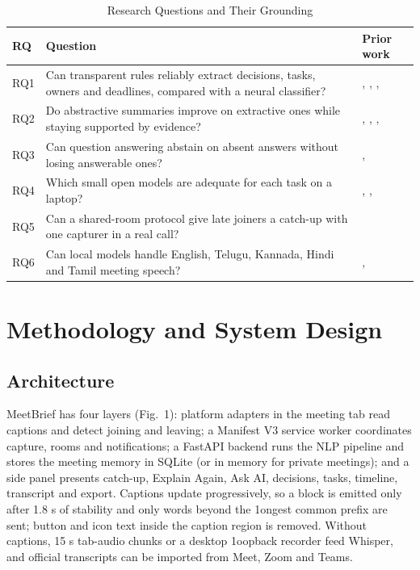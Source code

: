\documentclass[conference]{IEEEtran}
\begin{document}
\begin{table}[htbp]
\caption{Research Questions and Their Grounding}
\centering
\footnotesize
\begin{tabular}{|L{0.6cm}|L{4.9cm}|L{1.7cm}|}
\hline
\textbf{RQ} & \textbf{Question} & \textbf{Prior work} \\
\hline
RQ1 & Can transparent rules reliably extract decisions, tasks, owners and deadlines, compared with a neural classifier? & \cite{b3}, \cite{b7}, \cite{b8}, \cite{b21} \\
\hline
RQ2 & Do abstractive summaries improve on extractive ones while staying supported by evidence? & \cite{b5}, \cite{b12}, \cite{b13}, \cite{b16} \\
\hline
RQ3 & Can question answering abstain on absent answers without losing answerable ones? & \cite{b17}, \cite{b18} \\
\hline
RQ4 & Which small open models are adequate for each task on a laptop? & \cite{b12}, \cite{b21}, \cite{b26} \\
\hline
RQ5 & Can a shared-room protocol give late joiners a catch-up with one capturer in a real call? & \cite{b9} \\
\hline
RQ6 & Can local models handle English, Telugu, Kannada, Hindi and Tamil meeting speech? & \cite{b24}, \cite{b25} \\
\hline
\end{tabular}
\end{table}

\section{Methodology and System Design}
\subsection{Architecture}
MeetBrief has four layers (Fig.~1): platform adapters in the meeting tab read captions and detect joining and leaving; a Manifest V3 service worker coordinates capture, rooms and notifications; a FastAPI backend runs the NLP pipeline and stores the meeting memory in SQLite (or in memory for private meetings); and a side panel presents catch-up, Explain Again, Ask AI, decisions, tasks, timeline, transcript and export. Captions update progressively, so a block is emitted only after 1.8 s of stability and only words beyond the 1ongest common prefix are sent; button and icon text inside the caption region is removed. Without captions, 15 s tab-audio chunks or a desktop 1oopback recorder feed Whisper, and official transcripts can be imported from Meet, Zoom and Teams.
\end{document}
